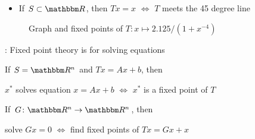 \begin{frame}
    
    \Eg
    \begin{itemize}
        \item If $S \subset \RR$, then  $Tx =x$ $\iff$ $T$ meets the 45 degree line
    \end{itemize}


\end{frame}



\begin{frame}
    
    \begin{figure}
        \centering
        \caption{\label{f:three_fixed_points} 
            Graph and fixed points of $T \colon x \mapsto 2.125/(1 + x^{-4})$ }
    \end{figure}

\end{frame}


\begin{frame}

    : Fixed point theory is for solving equations

    \vspace{1em}
    \vspace{1em}

    \Eg If $S = \RR^n$ and $T x = Ax + b$, then 
    \begin{center}
        $x^*$ solves equation  $x = Ax + b$
        $\iff$ 
        $x^*$ is a fixed point of $T$ 
    \end{center}


    \vspace{1em}

    \Eg  If $G \colon \RR^n \to \RR^n$, then
    \begin{center}
        solve $Gx = 0$ $\iff$ find fixed points of $Tx = Gx + x$
    \end{center}

    
\end{frame}


